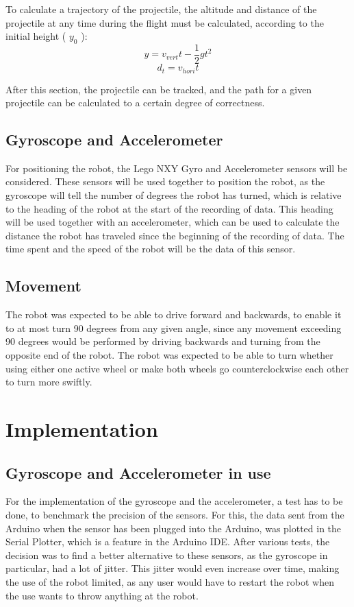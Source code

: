 To calculate a trajectory of the projectile, the altitude and distance of the projectile at any time during the flight must be calculated, according to the initial height ( \(y_{0}\) ):
\[y = v_{vert}t - \dfrac{1}{2} gt^2\]
\[d_{t} = v_{hori}t\]

After this section, the projectile can be tracked, and the path for a given projectile can be calculated to a certain degree of correctness. 

\subsection{Gyroscope and Accelerometer}
\label{sec:i1Gyroscope and Accelerometer}
For positioning the robot, the Lego NXY Gyro and Accelerometer sensors will be considered. These sensors will be used together to position the robot, as the gyroscope will tell the number of degrees the robot has turned, which is relative to the heading of the robot at the start of the recording of data. This heading will be used together with an accelerometer, which can be used to calculate the distance the robot has traveled since the beginning of the recording of data. The time spent and the speed of the robot will be the data of this sensor.


\subsection{Movement}
\label{sec:i1Movement}
The robot was expected to be able to drive forward and backwards, to enable it to at most turn 90 degrees from any given angle, since any movement exceeding 90 degrees would be performed by driving backwards and turning from the opposite end of the robot. The robot was expected to be able to turn whether using either one active wheel or make both wheels go counterclockwise each other to turn more swiftly.


\section{Implementation}
\label{sec:i1Implementation}

\subsection{Gyroscope and Accelerometer in use}
\label{sec:i1Gyroscope and Accelerometer in use}
For the implementation of the gyroscope and the accelerometer, a test has to be done, to benchmark the precision of the sensors. For this, the data sent from the Arduino when the sensor has been plugged into the Arduino, was plotted in the Serial Plotter, which is a feature in the Arduino IDE. After various tests, the decision was to find a better alternative to these sensors, as the gyroscope in particular, had a lot of jitter. This jitter would even increase over time, making the use of the robot limited, as any user would have to restart the robot when the use wants to throw anything at the robot.


